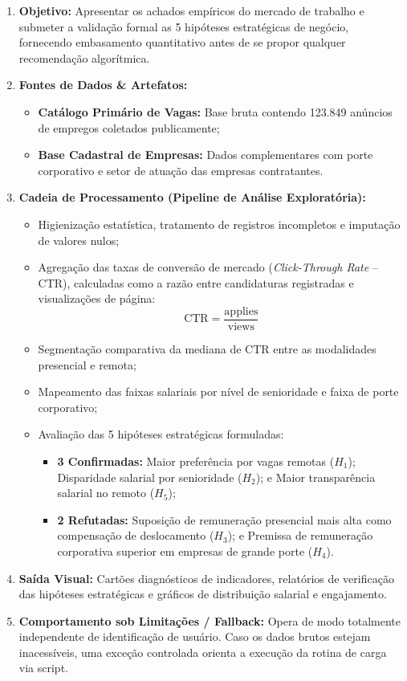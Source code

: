 \begin{enumerate}[label=\textbf{\arabic*.}]
    \item \textbf{Objetivo:} Apresentar os achados empíricos do mercado de trabalho e submeter a validação formal as 5 hipóteses estratégicas de negócio, fornecendo embasamento quantitativo antes de se propor qualquer recomendação algorítmica.
    \item \textbf{Fontes de Dados \& Artefatos:}
    \begin{itemize}
        \item \textbf{Catálogo Primário de Vagas:} Base bruta contendo 123.849 anúncios de empregos coletados publicamente;
        \item \textbf{Base Cadastral de Empresas:} Dados complementares com porte corporativo e setor de atuação das empresas contratantes.
    \end{itemize}
    \item \textbf{Cadeia de Processamento (Pipeline de Análise Exploratória):}
    \begin{itemize}
        \item Higienização estatística, tratamento de registros incompletos e imputação de valores nulos;
        \item Agregação das taxas de conversão de mercado (\textit{Click-Through Rate} -- CTR), calculadas como a razão entre candidaturas registradas e visualizações de página:
        \begin{equation}
            \text{CTR} = \frac{\text{applies}}{\text{views}}
        \end{equation}
        \item Segmentação comparativa da mediana de CTR entre as modalidades presencial e remota;
        \item Mapeamento das faixas salariais por nível de senioridade e faixa de porte corporativo;
        \item Avaliação das 5 hipóteses estratégicas formuladas:
        \begin{itemize}
            \item \textbf{3 Confirmadas:} Maior preferência por vagas remotas ($H_1$); Disparidade salarial por senioridade ($H_2$); e Maior transparência salarial no remoto ($H_5$);
            \item \textbf{2 Refutadas:} Suposição de remuneração presencial mais alta como compensação de deslocamento ($H_3$); e Premissa de remuneração corporativa superior em empresas de grande porte ($H_4$).
        \end{itemize}
    \end{itemize}
    \item \textbf{Saída Visual:} Cartões diagnósticos de indicadores, relatórios de verificação das hipóteses estratégicas e gráficos de distribuição salarial e engajamento.
    \item \textbf{Comportamento sob Limitações / Fallback:} Opera de modo totalmente independente de identificação de usuário. Caso os dados brutos estejam inacessíveis, uma exceção controlada orienta a execução da rotina de carga via script.
\end{enumerate}

